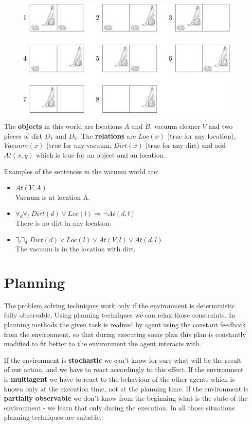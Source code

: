 \documentclass[a4paper,10pt]{article}
\begin{document}
\begin{figure}[h!]
\centering
\includegraphics[height=0.3\textwidth]{vacuum_world.pdf}
\end{figure}

The \textbf{objects} in this world are locations $A$ and $B$, vacuum cleaner $V$ and two pieces of dirt $D_1$ and $D_2$. The \textbf{relations } are $Loc(x)$ (true for any location), $Vacuum(x)$ (true for any vacuum, $Dirt(x)$ (true for any dirt) and add $At(x,y)$ which is true for an object and an location.

Examples of the sentences in the vacuum world are:
\begin{itemize}
\setlength{\itemsep}{0pt}
\setlength{\parskip}{0pt}
\setlength{\parsep}{0pt}
\item $At(V,A)$ \\Vacuum is at location A.
\item $\forall_d \forall_l \; Dirt(d) \lor Loc(l) \Rightarrow \lnot At(d,l)$ \\There is no dirt in any location.
\item $\exists_l \exists_d \; Dirt(d) \lor Loc(l) \lor At(V,l) \lor At(d,l) $ \\The vacuum is in the location with dirt.
\end{itemize}

\section{Planning}

The problem solving techniques work only if the environment is deterministic fully observable. Using planning techniques we can relax those constraints. In planning methods the given task is realized by agent using the constant feedback from the environment, so that during executing some plan this plan is constantly modified to fit better to the environment the agent interacts with.

If the environment is \textbf{stochastic} we can't know for sure what will be the result of our action, and we have to react accordingly to this effect. If the environment is \textbf{multiagent}  we have to react to the behaviour of the other agents which is known only at the execution time, not at the planning time. If the environment is \textbf{partially observable} we don't know from the beginning what is the state of the environment - we learn that only during the execution. In all those situations planning techniques are suitable.
\end{document}

